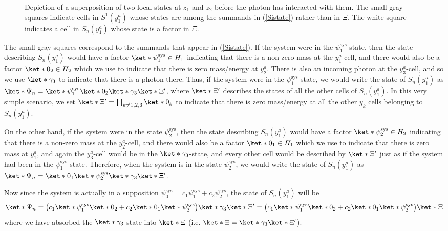 \documentclass[12pt]{report}
\begin{document}
\begin{figure}[ht!]
\vspace*{2px}
\caption[Depiction of localized states prior to any photon interaction]{Depiction of a superposition of two local states at $z_1$ and $z_2$ before the photon has interacted with them. The small gray squares indicate cells in $S^1(y^a_1)$ whose states are among the summands in (\ref{Sistate}) rather than in $\Xi$. The white square indicates a cell in $S_n(y^a_1)$ whose state is a factor in $\Xi$.}
\label{kentdeco1}
\end{figure}

The small gray squares correspond to the summands that appear in (\ref{Sistate}). If the system were in the $\psi_1^\text{sys}$-state, then the state describing $S_n(y^a_1)$ would have a factor $\ket*{\psi_1^\text{sys}}\in H_1$ indicating that there is a 
non-zero mass at the $y^a_1$-cell, and there would also be a factor $\ket*{0_2}\in H_2$ which we use to indicate that there is zero mass/energy at $y^a_2$. 
There is also an incoming photon at the $y^a_3$-cell, and so we use $\ket*{\gamma_3}$ to indicate that there is a photon there.
 Thus, if  the system  were in the $\psi_1^\text{sys}$-state, we would write the state of $S_n(y^a_1)$ 
 as $\ket*{\Psi_n}=\ket*{\psi_1^\text{sys}}\ket*{0_2}\ket*{\gamma_3}\ket*{\Xi'}$, where $\ket*{\Xi'}$ describes the states of all the other cells of $S_n(y^a_1)$. In this very simple scenario, we set $\ket*{\Xi'}=\prod_{k\neq 1,2,3}\ket*{0_k}$ to indicate that there is zero mass/energy at all the other $y_k$ cells belonging to $S_n(y^a_1)$.

 On the other hand, if the system were in the state $\psi_2^\text{sys}$, then the state describing $S_n(y^a_1)$ would have a factor $\ket*{\psi_2^\text{sys}}\in H_2$ 
 indicating that there is a non-zero mass at the $y^a_2$-cell, and there would also be a factor $\ket*{0_1}\in H_1$ which we use to indicate that there is zero mass at $y^a_1$,
  and again the $y^a_3$-cell would be in the $\ket*{\gamma_3}$-state, and every other cell would be described by  $\ket*{\Xi'}$  just as if the system had been in the $\psi_1^\text{sys}$-state. Therefore, when the system is in the state $\psi_2^\text{sys}$, we would write the state of $S_n(y^a_1)$ as $\ket*{\Psi_n}=\ket*{0_1}\ket*{\psi_2^\text{sys}}\ket*{\gamma_3}\ket*{\Xi'}$. 
 
 Now since the system is actually in a supposition $\psi_0^\text{sys} = c_1\psi_1^\text{sys}+c_2\psi_2^\text{sys}$, the state of $S_n(y^a_1)$ will be 
 \begin{equation*}
 \ket*{\Psi_n}=\big(c_1\ket*{\psi_1^\text{sys}}\ket*{0_2}+c_2\ket*{0_1}\ket*{\psi_2^\text{sys}}\big)\ket*{\gamma_3}\ket*{\Xi'}=\big(c_1\ket*{\psi_1^\text{sys}}\ket*{0_2}+c_2\ket*{0_1}\ket*{\psi_2^\text{sys}}\big)\ket*{\Xi}
 \end{equation*}
where we have absorbed the $\ket*{\gamma_3}$-state into $\ket*{\Xi}$ (i.e. $\ket*{\Xi}= \ket*{\gamma_3}\ket*{\Xi'}$).
\end{document}
